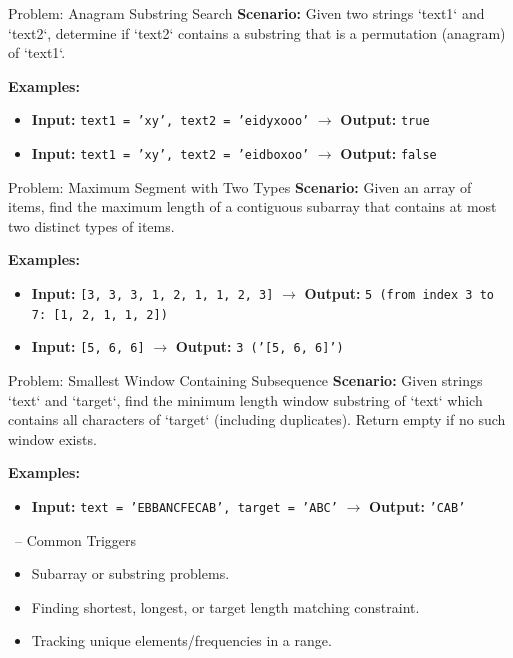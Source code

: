 \begin{frame}[fragile]{Problem: Anagram Substring Search}
  \textbf{Scenario:}
  Given two strings `text1` and `text2`, determine if `text2` contains a substring that is a permutation (anagram) of `text1`.
  
  \vspace{0.3cm}
  \textbf{Examples:}
  \begin{itemize}
    \item \textbf{Input:} \texttt{text1 = 'xy', text2 = 'eidyxooo'} $\rightarrow$ \textbf{Output:} \texttt{true}
    \item \textbf{Input:} \texttt{text1 = 'xy', text2 = 'eidboxoo'} $\rightarrow$ \textbf{Output:} \texttt{false}
  \end{itemize}
\end{frame}


\begin{frame}[fragile]{Problem: Maximum Segment with Two Types}
  \textbf{Scenario:}
  Given an array of items, find the maximum length of a contiguous subarray that contains at most two distinct types of items.
  
  \vspace{0.3cm}
  \textbf{Examples:}
  \begin{itemize}
    \item \textbf{Input:} \texttt{[3, 3, 3, 1, 2, 1, 1, 2, 3]} $\rightarrow$ \textbf{Output:} \texttt{5 (from index 3 to 7: [1, 2, 1, 1, 2])}
    \item \textbf{Input:} \texttt{[5, 6, 6]} $\rightarrow$ \textbf{Output:} \texttt{3 ('[5, 6, 6]')}
  \end{itemize}
\end{frame}

\begin{frame}[fragile]{Problem: Smallest Window Containing Subsequence}
  \textbf{Scenario:}
  Given strings `text` and `target`, find the minimum length window substring of `text` which contains all characters of `target` (including duplicates). Return empty if no such window exists.
  
  \vspace{0.3cm}
  \textbf{Examples:}
  \begin{itemize}
    \item \textbf{Input:} \texttt{text = 'EBBANCFECAB', target = 'ABC'} $\rightarrow$ \textbf{Output:} \texttt{'CAB'}
  \end{itemize}
\end{frame}

\begin{frame}{\secname\ -- Common Triggers}
  \begin{itemize}
    \item Subarray or substring problems.
        \item Finding shortest, longest, or target length matching constraint.
        \item Tracking unique elements/frequencies in a range.
  \end{itemize}
\end{frame}
